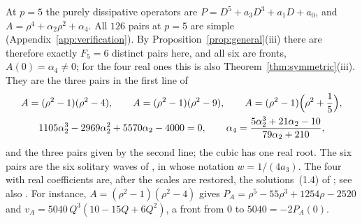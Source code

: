 At \(p=5\) the purely dissipative operators are
\(P=D^5+a_3D^3+a_1D+a_0\), and \(A=\rho^4+\alpha_2\rho^2+\alpha_4\).
All \(126\) pairs at \(p=5\) are simple
(Appendix~\ref{app:verification}). By
Proposition~\ref{prop:general}(iii) there are therefore exactly
\(F_5=6\) distinct pairs here, and all six are fronts,
\(A(0)=\alpha_4\ne0\); for the four real ones this is also
Theorem~\ref{thm:symmetric}(iii). They are the three pairs in the
first line of
\begin{equation}\label{eq:p5-symmetric}
 \begin{gathered}
 A=(\rho^2-1)(\rho^2-4),\qquad
 A=(\rho^2-1)(\rho^2-9),\qquad
 A=(\rho^2-1)\Bigl(\rho^2+\frac15\Bigr),\\
 1105\alpha_2^3-2969\alpha_2^2+5570\alpha_2-4000=0,\qquad
 \alpha_4=\frac{5\alpha_2^3+21\alpha_2-10}{79\alpha_2+210},
 \end{gathered}
\end{equation}
and the three pairs given by the second line; the cubic has one real
root. The six pairs are the six solitary waves of
\citet{KudryashovDemina2007}, in whose notation \(w=1/(4a_3)\). The
four with real coefficients are, after the scales are restored, the
solutions~(1.4) of \citet{KudryashovMigita2007}; see also
\citet{RyabovSinelshchikovKochanov2011}. For instance,
\(A=(\rho^2-1)(\rho^2-4)\) gives
\(P_A=\rho^5-55\rho^3+1254\rho-2520\) and
\(v_A=5040\,Q^3(10-15Q+6Q^2)\), a front from \(0\) to
\(5040=-2P_A(0)\).
